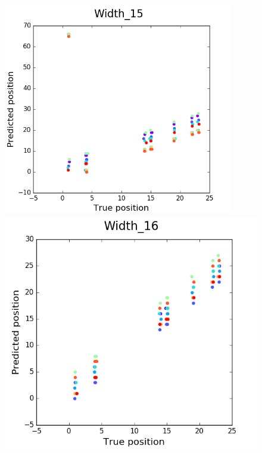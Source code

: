 \documentclass[11pt, oneside]{article}
\begin{document}
\begin{figure}[htbp]
  \hfill
  \begin{minipage}{0.3\textwidth}
    \centering
    \includegraphics[width=0.9\textwidth]{images/Width_15} %
  \end{minipage}
  \vfill
  \begin{minipage}{0.32\textwidth}
    \centering
    \includegraphics[width=\textwidth]{images/Width_16} %

\end{minipage}
\end{figure}
\end{document}
